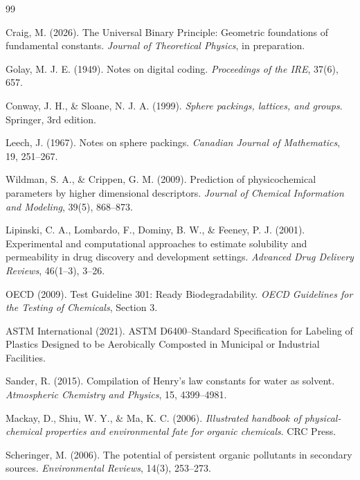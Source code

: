 \documentclass[11pt,letterpaper]{article}
\begin{document}
\clearpage

\begin{thebibliography}{99}

Craig, M. (2026). The Universal Binary Principle: Geometric foundations of fundamental constants. \textit{Journal of Theoretical Physics}, in preparation.

Golay, M. J. E. (1949). Notes on digital coding. \textit{Proceedings of the IRE}, 37(6), 657.

Conway, J. H., \& Sloane, N. J. A. (1999). \textit{Sphere packings, lattices, and groups}. Springer, 3rd edition.

Leech, J. (1967). Notes on sphere packings. \textit{Canadian Journal of Mathematics}, 19, 251--267.

Wildman, S. A., \& Crippen, G. M. (2009). Prediction of physicochemical parameters by higher dimensional descriptors. \textit{Journal of Chemical Information and Modeling}, 39(5), 868--873.

Lipinski, C. A., Lombardo, F., Dominy, B. W., \& Feeney, P. J. (2001). Experimental and computational approaches to estimate solubility and permeability in drug discovery and development settings. \textit{Advanced Drug Delivery Reviews}, 46(1--3), 3--26.

OECD (2009). Test Guideline 301: Ready Biodegradability. \textit{OECD Guidelines for the Testing of Chemicals}, Section 3.

ASTM International (2021). ASTM D6400--Standard Specification for Labeling of Plastics Designed to be Aerobically Composted in Municipal or Industrial Facilities.

Sander, R. (2015). Compilation of Henry's law constants for water as solvent. \textit{Atmospheric Chemistry and Physics}, 15, 4399--4981.

Mackay, D., Shiu, W. Y., \& Ma, K. C. (2006). \textit{Illustrated handbook of physical-chemical properties and environmental fate for organic chemicals}. CRC Press.

Scheringer, M. (2006). The potential of persistent organic pollutants in secondary sources. \textit{Environmental Reviews}, 14(3), 253--273.


\end{thebibliography}
\end{document}
